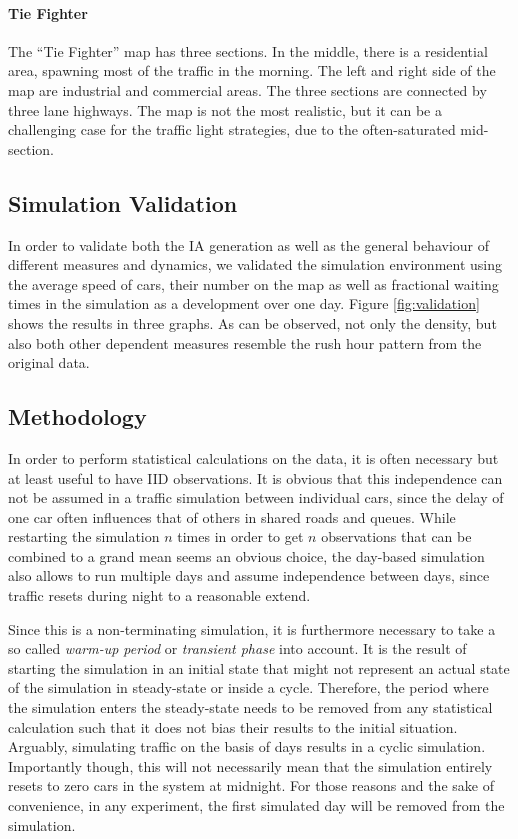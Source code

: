 \documentclass[11pt]{article}
\begin{document}
\paragraph{Tie Fighter} The “Tie Fighter” map has three sections. In the middle, there is a residential area, spawning most of the traffic in the morning. The left and right side of the map are industrial and commercial areas. The three sections are connected by three lane highways. The map is not the most realistic, but it can be a challenging case for the traffic light strategies, due to the often-saturated mid-section.

\subsection{Simulation Validation}
In order to validate both the IA generation as well as the general behaviour of different measures and dynamics, we validated the simulation environment using the average speed of cars, their number on the map as well as fractional waiting times in the simulation as a development over one day. Figure \ref{fig:validation} shows the results in three graphs. As can be observed, not only the density, but also both other dependent measures resemble the rush hour pattern from the original data.

\subsection{Methodology}
In order to perform statistical calculations on the data, it is often necessary but at least useful to have IID observations. It is obvious that this independence can not be assumed in a traffic simulation between individual cars, since the delay of one car often influences that of others in shared roads and queues. While restarting the simulation $n$ times in order to get $n$ observations that can be combined to a grand mean seems an obvious choice, the day-based simulation also allows to run multiple days and assume independence between days, since traffic resets during night to a reasonable extend.

Since this is a non-terminating simulation, it is furthermore necessary to take a so called \textit{warm-up period} or \textit{transient phase} into account. It is the result of starting the simulation in an initial state that might not represent an actual state of the simulation in steady-state or inside a cycle. Therefore, the period where the simulation enters the steady-state needs to be removed from any statistical calculation such that it does not bias their results to the initial situation. Arguably, simulating traffic on the basis of days results in a cyclic simulation. Importantly though, this will not necessarily mean that the simulation entirely resets to zero cars in the system at midnight. For those reasons and the sake of convenience, in any experiment, the first simulated day will be removed from the simulation. 
\end{document}
